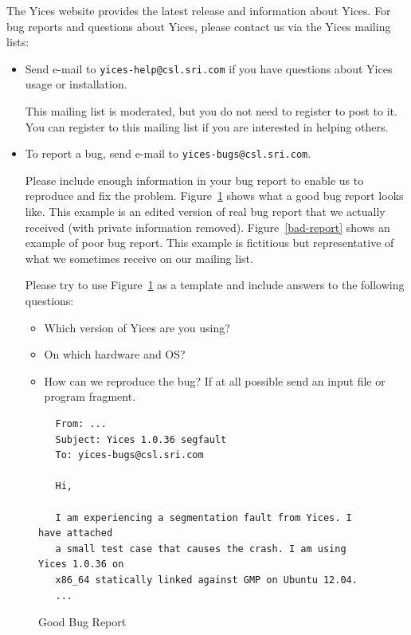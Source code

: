 \documentclass[11pt,twoside,fleqn,openright,titlepage]{cslreport}
\begin{document}
The Yices  website provides the  latest release and  information about
Yices.  For bug  reports and questions about Yices,  please contact us
via the Yices mailing lists:
\begin{itemize}
\item Send e-mail to \texttt{yices-help@csl.sri.com} if you have
  questions about Yices usage or installation.

  This mailing list is moderated, but you do not need to register to
  post to it. You can register to this mailing list if you are
  interested in helping others.

\item To report a bug, send e-mail to \texttt{yices-bugs@csl.sri.com}.

  Please include enough information in your bug report to enable us to
  reproduce and fix the problem. Figure~\ref{good-report} shows what a
  good bug report looks like. This example is an edited version of
  real bug report that we actually received (with private information
  removed). Figure~\ref{bad-report} shows an example of poor bug
  report. This example is fictitious but representative of what we
  sometimes receive on our mailing list.

 Please try to use Figure~\ref{good-report} as a template and include answers to the
 following questions:
    \begin{itemize}
    \item Which version of Yices are you using?
    \item On which hardware and OS?
    \item How can we reproduce the bug? If at all possible send an input file
      or program fragment.
    \end{itemize}
\end{itemize}

\begin{figure}
\begin{center}
\begin{footnotesize}
\begin{verbatim}
   From: ...
   Subject: Yices 1.0.36 segfault
   To: yices-bugs@csl.sri.com

   Hi,

   I am experiencing a segmentation fault from Yices. I have attached
   a small test case that causes the crash. I am using Yices 1.0.36 on
   x86_64 statically linked against GMP on Ubuntu 12.04.
   ...
\end{verbatim}
\end{footnotesize}
\end{center}
\caption{Good Bug Report}
\label{good-report}
\end{figure}
\end{document}
